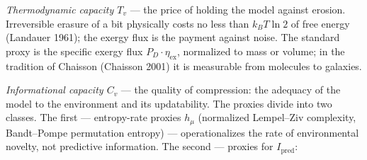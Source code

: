 \documentclass[pdflatex,sn-mathphys-ay]{sn-jnl}
\begin{document}
\emph{Thermodynamic capacity \(T_v\)} --- the price of holding the model against erosion. Irreversible erasure of a bit physically costs no less than \(k_B T \ln 2\) of free energy (Landauer 1961); the exergy flux is the payment against noise. The standard proxy is the specific exergy flux \(P_D \cdot \eta_{\text{ex}}\), normalized to mass or volume; in the tradition of Chaisson (Chaisson 2001) it is measurable from molecules to galaxies.

\emph{Informational capacity \(C_v\)} --- the quality of compression: the adequacy of the model to the environment and its updatability. The proxies divide into two classes. The first --- entropy-rate proxies \(h_\mu\) (normalized Lempel--Ziv complexity, Bandt--Pompe permutation entropy) --- operationalizes the rate of environmental novelty, not predictive information. The second --- proxies for \(I_{\text{pred}}\):
\end{document}
